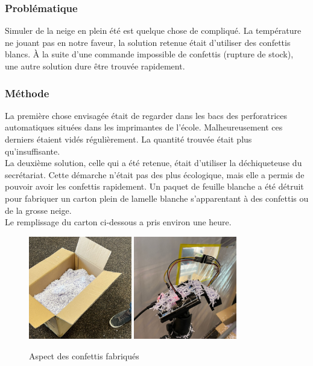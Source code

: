 \subsubsection{Problématique}

Simuler de la neige en plein été est quelque chose de compliqué. La température ne jouant pas en notre 
faveur, la solution retenue était d’utiliser des confettis blancs. À la suite d’une commande impossible 
de confettis (rupture de stock), une autre solution dure être trouvée rapidement.

\subsubsection{Méthode}

La première chose envisagée était de regarder dans les bacs des perforatrices automatiques situées 
dans les imprimantes de l’école. Malheureusement ces derniers étaient vidés régulièrement. La quantité 
trouvée était plus qu’insuffisante.\\
La deuxième solution, celle qui a été retenue, était d’utiliser la déchiqueteuse du secrétariat. Cette 
démarche n’était pas des plus écologique, mais elle a permis de pouvoir avoir les confettis rapidement. 
Un paquet de feuille blanche a été détruit pour fabriquer un carton plein de lamelle blanche s’apparentant 
à des confettis ou de la grosse neige. \\
Le remplissage du carton ci-dessous a pris environ une heure. 

\begin{figure}[H]
    \centering
    \includegraphics[width=0.4\textwidth]{Images/photos_PGA/ConfBox.jpeg}
    \includegraphics[width=0.4\textwidth]{Images/photos_PGA/conf.jpeg}
    \caption{Aspect des confettis fabriqués}
    \label{fig:confettis}
\end{figure}

